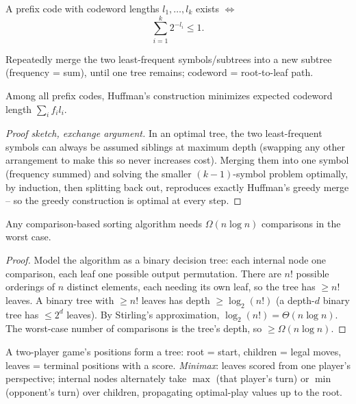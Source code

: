 \documentclass[11pt]{article}
\begin{document}
\begin{theorem}
A prefix code with codeword lengths $l_1,\dots,l_k$ exists $\iff$
\[
\sum_{i=1}^k 2^{-l_i} \le 1.
\]
\end{theorem}

\bigskip
\begin{definition}
Repeatedly merge the two least-frequent symbols/subtrees into a new subtree (frequency = sum), until one tree remains; codeword = root-to-leaf path.
\end{definition}

\begin{theorem}
Among all prefix codes, Huffman's construction minimizes expected codeword length $\sum_i f_i l_i$.
\end{theorem}
\begin{proof}[Proof sketch, exchange argument]
In an optimal tree, the two least-frequent symbols can always be assumed siblings at maximum depth (swapping any other arrangement to make this so never increases cost). Merging them into one symbol (frequency summed) and solving the smaller $(k-1)$-symbol problem optimally, by induction, then splitting back out, reproduces exactly Huffman's greedy merge -- so the greedy construction is optimal at every step.
\end{proof}

\bigskip
\begin{theorem}
Any comparison-based sorting algorithm needs $\Omega(n\log n)$ comparisons in the worst case.
\end{theorem}
\begin{proof}
Model the algorithm as a binary decision tree: each internal node one comparison, each leaf one possible output permutation. There are $n!$ possible orderings of $n$ distinct elements, each needing its own leaf, so the tree has $\ge n!$ leaves. A binary tree with $\ge n!$ leaves has depth $\ge\log_2(n!)$ (a depth-$d$ binary tree has $\le2^d$ leaves). By Stirling's approximation, $\log_2(n!) = \Theta(n\log n)$. The worst-case number of comparisons is the tree's depth, so $\ge\Omega(n\log n)$.
\end{proof}

\bigskip
\begin{note}
A two-player game's positions form a tree: root = start, children = legal moves, leaves = terminal positions with a score. \emph{Minimax}: leaves scored from one player's perspective; internal nodes alternately take $\max$ (that player's turn) or $\min$ (opponent's turn) over children, propagating optimal-play values up to the root.
\end{note}
\end{document}
